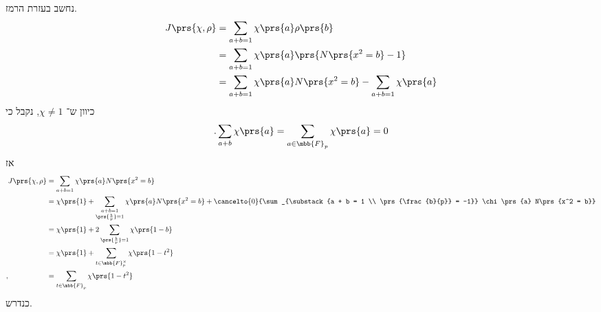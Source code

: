\documentclass[a4paper,10pt,twoside,openany]{book}
\begin{document}
\begin{solution}
נחשב בעזרת הרמז.
\begin{align*}
J\prs{\chi, \rho} &= \sum_{a+b = 1} \chi\prs{a} \rho\prs{b}
\\&= \sum_{a+b = 1} \chi\prs{a} \prs{N\prs{x^2 = b} - 1}
\\&= \sum_{a + b = 1} \chi\prs{a} N\prs{x^2 = b} - \sum_{a+b = 1} \chi\prs{a}
\end{align*}
כיוון ש־%
$\chi \neq 1$,
נקבל כי
\[\text{.} \sum_{a+b} \chi\prs{a} = \sum_{a \in \mbb{F}_p} \chi\prs{a} = 0\]
אז
\begin{align*}
J\prs{\chi, \rho} &= \sum_{a + b = 1} \chi\prs{a} N\prs{x^2 = b}
\\&= \chi\prs{1} + \sum_{\substack{a + b = 1 \\ \prs{\frac{b}{p}} = 1}} \chi\prs{a} N\prs{x^2 = b} + \cancelto{0}{\sum_{\substack{a + b = 1 \\ \prs{\frac{b}{p}} = -1}} \chi\prs{a} N\prs{x^2 = b}}
\\&= \chi\prs{1} + 2 \sum_{\substack{\prs{\frac{b}{p}} = 1}} \chi\prs{1-b}
\\&= \chi\prs{1} + \sum_{t \in \mbb{F}_p^\times} \chi\prs{1 - t^2}
\\ \text{,} \hphantom{J\prs{\chi, \rho}} &= \sum_{t \in \mbb{F}_p} \chi\prs{1 - t^2}
\end{align*}
כנדרש.
\end{solution}
\end{document}
